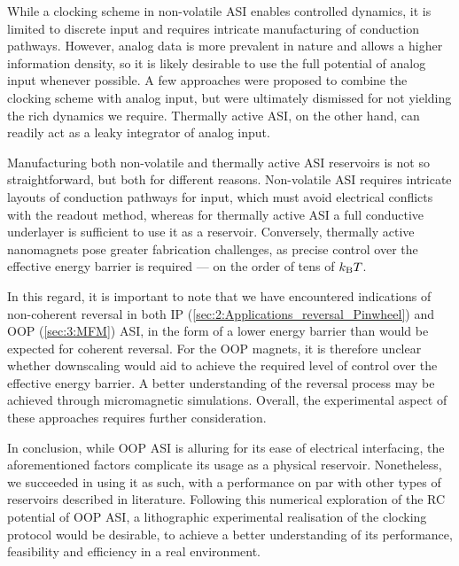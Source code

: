 While a clocking scheme in non-volatile ASI enables controlled dynamics, it is limited to discrete input and requires intricate manufacturing of conduction pathways.
However, analog data is more prevalent in nature and allows a higher information density, so it is likely desirable to use the full potential of analog input whenever possible.
A few approaches were proposed to combine the clocking scheme with analog input, but were ultimately dismissed for not yielding the rich dynamics we require.
Thermally active ASI, on the other hand, can readily act as a leaky integrator of analog input. \par
Manufacturing both non-volatile and thermally active ASI reservoirs is not so straightforward, but both for different reasons.
Non-volatile ASI requires intricate layouts of conduction pathways for input, which must avoid electrical conflicts with the readout method, whereas for thermally active ASI a full conductive underlayer is sufficient to use it as a reservoir.
Conversely, thermally active nanomagnets pose greater fabrication challenges, as precise control over the effective energy barrier is required --- on the order of tens of $\kBT$. \par
In this regard, it is important to note that we have encountered indications of non-coherent reversal in both IP (\cref{sec:2:Applications_reversal_Pinwheel}) and OOP (\cref{sec:3:MFM}) ASI, in the form of a lower energy barrier than would be expected for coherent reversal.
For the OOP magnets, it is therefore unclear whether downscaling would aid to achieve the required level of control over the effective energy barrier.
A better understanding of the reversal process may be achieved through micromagnetic simulations.
Overall, the experimental aspect of these approaches requires further consideration. \\\par

In conclusion, while OOP ASI is alluring for its ease of electrical interfacing, the aforementioned factors complicate its usage as a physical reservoir.
Nonetheless, we succeeded in using it as such, with a performance on par with other types of reservoirs described in literature.
Following this numerical exploration of the RC potential of OOP ASI, a lithographic experimental realisation of the clocking protocol would be desirable, to achieve a better understanding of its performance, feasibility and efficiency in a real environment.



